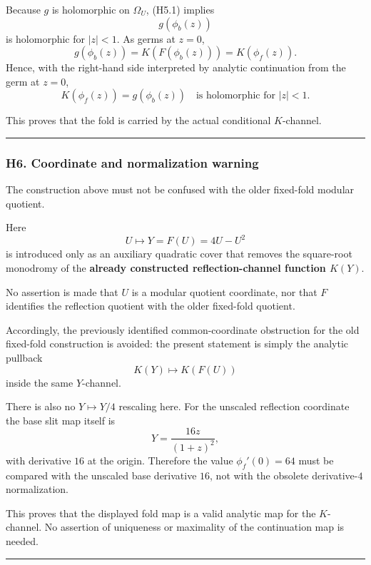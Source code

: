 \documentclass[
  10pt,
  letterpaper,
]{article}
\theoremstyle{definition}
\theoremstyle{remark}
\begin{document}
Because \(g\) is holomorphic on \(\Omega_U\), (H5.1) implies \[
g(\phi_b(z))
\] is holomorphic for \(|z|<1\). As germs at \(z=0\), \[
g(\phi_b(z))
=
K(F(\phi_b(z)))
=
K(\phi_f(z)).
\] Hence, with the right-hand side interpreted by analytic continuation
from the germ at \(z=0\), \[
\boxed{
K(\phi_f(z))
=
g(\phi_b(z))
\quad\text{is holomorphic for }|z|<1.
}
\tag{H5.4}
\]

This proves that the fold is carried by the actual conditional
\(K\)-channel.

\begin{center}\rule{0.5\linewidth}{0.5pt}\end{center}

\subsubsection{H6. Coordinate and normalization
warning}\label{h6.-coordinate-and-normalization-warning}

The construction above must not be confused with the older fixed-fold
modular quotient.

Here \[
U\longmapsto Y=F(U)=4U-U^2
\] is introduced only as an auxiliary quadratic cover that removes the
square-root monodromy of the \textbf{already constructed
reflection-channel function \(K(Y)\)}.

No assertion is made that \(U\) is a modular quotient coordinate, nor
that \(F\) identifies the reflection quotient with the older fixed-fold
quotient.

Accordingly, the previously identified common-coordinate obstruction for
the old fixed-fold construction is avoided: the present statement is
simply the analytic pullback \[
K(Y)\longmapsto K(F(U))
\] inside the same \(Y\)-channel.

There is also no \(Y\mapsto Y/4\) rescaling here. For the unscaled
reflection coordinate the base slit map itself is \[
Y=\frac{16z}{(1+z)^2},
\] with derivative \(16\) at the origin. Therefore the value
\(\phi_f'(0)=64\) must be compared with the unscaled base derivative
\(16\), not with the obsolete derivative-\(4\) normalization.

This proves that the displayed fold map is a valid analytic map for the
\(K\)-channel. No assertion of uniqueness or maximality of the
continuation map is needed.

\begin{center}\rule{0.5\linewidth}{0.5pt}\end{center}
\end{document}
